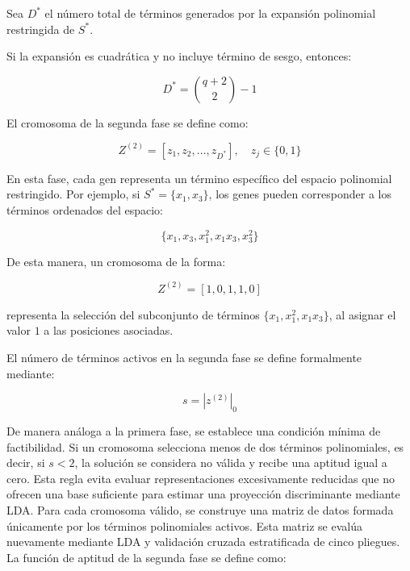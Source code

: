 Sea $D^*$ el número total de términos generados por la expansión polinomial restringida de $S^*$.

Si la expansión es cuadrática y no incluye término de sesgo, entonces:


\begin{equation}
	D^* = \binom{q+2}{2}-1
	\label{eq:EM7}
\end{equation}

El cromosoma de la segunda fase se define como:

\begin{equation}
	Z^{(2)} = [z_1,z_2,\dots,z_{D^*}],\quad z_j \in \{0,1\}
	\label{eq:EM8}
\end{equation}

En esta fase, cada gen representa un término específico del espacio polinomial restringido. Por ejemplo, si $S^*= \{x_1,x_3\}$, los genes pueden corresponder a los términos ordenados del espacio:

\begin{equation}
	\{x_1,x_3,x_1^2,x_1x_3,x_3^2\}
	\label{eq:EM9}
\end{equation}

De esta manera, un cromosoma de la forma:

\begin{equation}
	Z^{(2)} = [1, 0, 1, 1, 0]
	\label{eq:EM10}
\end{equation}

representa la selección del subconjunto de términos $\{x_1, x_1^2, x_1 x_3\}$, al asignar el valor $1$ a las posiciones asociadas.

El número de términos activos en la segunda fase se define formalmente mediante:

\begin{equation}
	s = |z^{(2)}|_0
	\label{eq:EM11}
\end{equation}

De manera análoga a la primera fase, se establece una condición mínima de factibilidad. Si un cromosoma selecciona menos de dos términos polinomiales, es decir, si $s<2$, la solución se considera no válida y recibe una aptitud igual a cero. Esta regla evita evaluar representaciones excesivamente reducidas que no ofrecen una base suficiente para estimar una proyección discriminante mediante LDA.
Para cada cromosoma válido, se construye una matriz de datos formada únicamente por los términos polinomiales activos. Esta matriz se evalúa nuevamente mediante LDA y validación cruzada estratificada de cinco pliegues. La función de aptitud de la segunda fase se define como:

